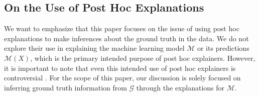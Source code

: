 \documentclass[mnsc,blindrev]{informs3}
\newcommand{\mM}{\mathcal{M}}
\begin{document}

    
    
    \subsection{On the Use of Post Hoc Explanations}
  We want to emphasize that this paper focuses on the issue of using post hoc explanations to make inferences about the ground truth in the data. We do not explore their use in explaining the machine learning model $\mM$ or its predictions $\mathcal{M}(X)$, which is the primary intended purpose of post hoc explainers. However, it is important to note that even this intended use of post hoc explainers is controversial \citep{garreau2020looking,alvarez18robustness,kumar20shap,jacovi2023diagnosing}. For the scope of this paper, our discussion is solely focused on inferring ground truth information from $\mathcal{G}$ through the explanations for $\mathcal{M}$.
\end{document}

